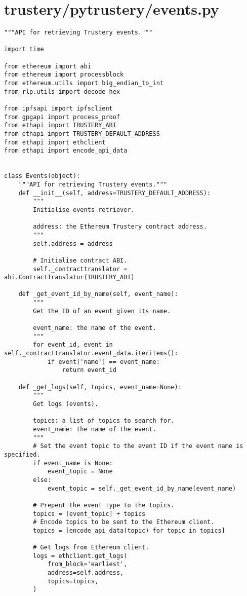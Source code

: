 \documentclass[12pt]{report}
\begin{document}
	\section{trustery/pytrustery/events.py}
	\begin{lstlisting}
"""API for retrieving Trustery events."""

import time

from ethereum import abi
from ethereum import processblock
from ethereum.utils import big_endian_to_int
from rlp.utils import decode_hex

from ipfsapi import ipfsclient
from gpgapi import process_proof
from ethapi import TRUSTERY_ABI
from ethapi import TRUSTERY_DEFAULT_ADDRESS
from ethapi import ethclient
from ethapi import encode_api_data


class Events(object):
    """API for retrieving Trustery events."""
    def __init__(self, address=TRUSTERY_DEFAULT_ADDRESS):
        """
        Initialise events retriever.

        address: the Ethereum Trustery contract address.
        """
        self.address = address

        # Initialise contract ABI.
        self._contracttranslator = abi.ContractTranslator(TRUSTERY_ABI)

    def _get_event_id_by_name(self, event_name):
        """
        Get the ID of an event given its name.

        event_name: the name of the event.
        """
        for event_id, event in self._contracttranslator.event_data.iteritems():
            if event['name'] == event_name:
                return event_id

    def _get_logs(self, topics, event_name=None):
        """
        Get logs (events).

        topics: a list of topics to search for.
        event_name: the name of the event.
        """
        # Set the event topic to the event ID if the event name is specified.
        if event_name is None:
            event_topic = None
        else:
            event_topic = self._get_event_id_by_name(event_name)

        # Prepent the event type to the topics.
        topics = [event_topic] + topics
        # Encode topics to be sent to the Ethereum client.
        topics = [encode_api_data(topic) for topic in topics]

        # Get logs from Ethereum client.
        logs = ethclient.get_logs(
            from_block='earliest',
            address=self.address,
            topics=topics,
        )


\end{lstlisting}
\end{document}
